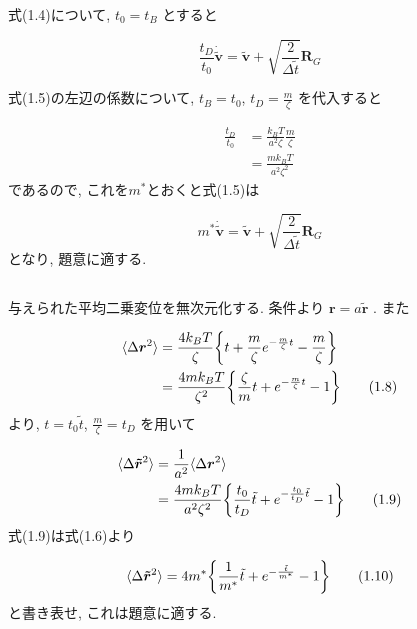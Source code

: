 \documentclass[a4paper,dvipdfmx]{jarticle}
\begin{document}
\noindent
式(1.4)について, $t_0=t_B$ とすると

\begin{equation}
    \frac{t_D}{t_0} \bm{\dot{\tilde{v}}} = \bm{\tilde{v}} 
    + \sqrt{\frac{2}{\Delta \tilde{t}}}\bm{R}_G \tag{1.5} 
\end{equation}

\noindent
式(1.5)の左辺の係数について, $t_B=t_0$, $t_D=\frac{m}{\zeta}$ を代入すると

\begin{align*}
    \frac{t_D}{t_0} &= \frac{k_BT}{a^2\zeta} \frac{m}{\zeta} \\
    &= \frac{mk_BT}{a^2\zeta^2} \tag{1.6}
\end{align*}
であるので, これを$m^*$とおくと式(1.5)は

\begin{equation}
    m^* \bm{\dot{\tilde{v}}} = \bm{\tilde{v}} 
    + \sqrt{\frac{2}{\Delta \tilde{t}}}\bm{R}_G \tag{1.7} 
\end{equation}
となり, 題意に適する.


\subsection{}
\noindent
与えられた平均二乗変位を無次元化する.
条件より $\bm{r}=a\bm{\tilde{r}}$ .
また

\begin{align*}
    \langle \Delta \bm{r}^2 \rangle 
    &= \frac{4k_BT}{\zeta} \qty{t + \frac{m}{\zeta} e^{-\frac{m}{\zeta}t} - \frac{m}{\zeta}} \\
    &= \frac{4mk_BT}{\zeta^2} \qty{\frac{\zeta}{m} t + e^{-\frac{m}{\zeta}t} - 1} \tag{1.8}
\end{align*}
より, $t=t_0\tilde{t}$, $\frac{m}{\zeta}=t_D$ を用いて

\begin{align*}
    \langle \Delta \bm{\tilde{r}}^2 \rangle &=  \frac{1}{a^2} \langle \Delta \bm{r}^2 \rangle \\
    &= \frac{4mk_BT}{a^2\zeta^2} \qty{\frac{t_0}{t_D} \tilde{t} + e^{-\frac{t_0}{t_D} \tilde{t}} - 1} \tag{1.9}
\end{align*}
式(1.9)は式(1.6)より

\begin{equation}
        \langle \Delta \bm{\tilde{r}}^2 \rangle 
        = 4m^* \qty{\frac{1}{m^*} \tilde{t} + e^{-\frac{\tilde{t}}{m^*}} - 1} \tag{1.10}
\end{equation}
と書き表せ, これは題意に適する.
\end{document}
